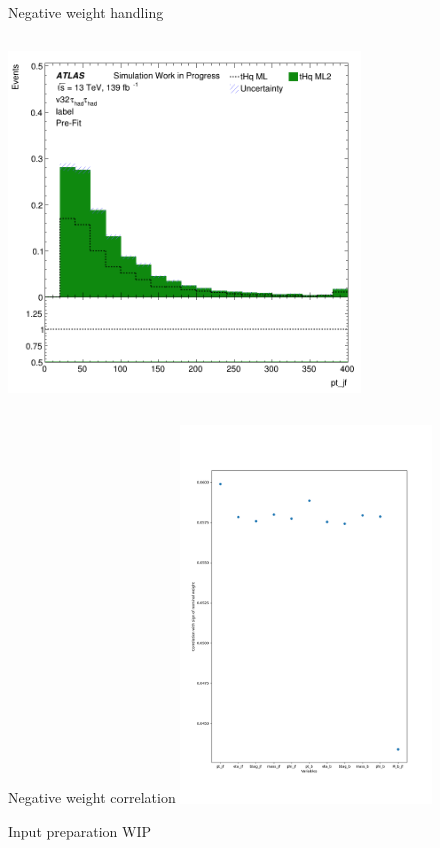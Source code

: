 \documentclass[10pt, UKenglish]{beamer}
\begin{document}
\begin{frame}{Negative weight handling}
\begin{columns}
\begin{column}{0.5\textwidth}
      \includegraphics[width=0.7\textwidth]{pt_jf}
    \end{column}
  \end{columns}
\end{frame}
%
\begin{frame}{Negative weight correlation}
  \centering \includegraphics[width=0.5\textwidth]{negWeight_sign_corr}
\end{frame}
%
\begin{frame}{Input preparation}
  WIP
\end{frame}
%
\end{document}
